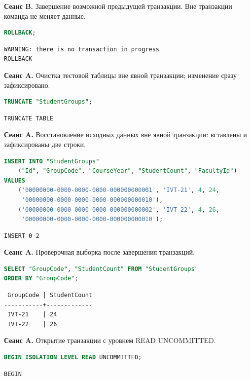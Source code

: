 \documentclass[12pt,a4paper]{article}
\begin{document}
\textbf{Сеанс B.} Завершение возможной предыдущей транзакции. Вне транзакции команда не меняет данные.
\begin{lstlisting}[language=SQL]
ROLLBACK;
\end{lstlisting}

\begin{lstlisting}
WARNING: there is no transaction in progress
ROLLBACK
\end{lstlisting}

\textbf{Сеанс A.} Очистка тестовой таблицы вне явной транзакции; изменение сразу зафиксировано.
\begin{lstlisting}[language=SQL]
TRUNCATE "StudentGroups";
\end{lstlisting}

\begin{lstlisting}
TRUNCATE TABLE
\end{lstlisting}

\textbf{Сеанс A.} Восстановление исходных данных вне явной транзакции: вставлены и зафиксированы две строки.
\begin{lstlisting}[language=SQL]
INSERT INTO "StudentGroups"
    ("Id", "GroupCode", "CourseYear", "StudentCount", "FacultyId")
VALUES
    ('00000000-0000-0000-0000-000000000001', 'IVT-21', 4, 24,
     '00000000-0000-0000-0000-000000000010'),
    ('00000000-0000-0000-0000-000000000002', 'IVT-22', 4, 26,
     '00000000-0000-0000-0000-000000000010');
\end{lstlisting}

\begin{lstlisting}
INSERT 0 2
\end{lstlisting}

\textbf{Сеанс A.} Проверочная выборка после завершения транзакций.
\begin{lstlisting}[language=SQL]
SELECT "GroupCode", "StudentCount" FROM "StudentGroups"
ORDER BY "GroupCode";
\end{lstlisting}

\begin{lstlisting}
 GroupCode | StudentCount
-----------+-------------
 IVT-21    | 24
 IVT-22    | 26
\end{lstlisting}

\textbf{Сеанс A.} Открытие транзакции с уровнем READ UNCOMMITTED.
\begin{lstlisting}[language=SQL]
BEGIN ISOLATION LEVEL READ UNCOMMITTED;
\end{lstlisting}

\begin{lstlisting}
BEGIN
\end{lstlisting}
\end{document}
